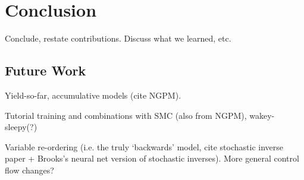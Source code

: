 \section{Conclusion}
\label{sec:conclusion}

Conclude, restate contributions. Discuss what we learned, etc.

\subsection{Future Work}
\label{sec:conclusion_futureWork}

Yield-so-far, accumulative models (cite NGPM).

Tutorial training and combinations with SMC (also from NGPM), wakey-sleepy(?)

Variable re-ordering (i.e. the truly `backwards' model, cite stochastic inverse paper + Brooks's neural net version of stochastic inverses). More general control flow changes?
